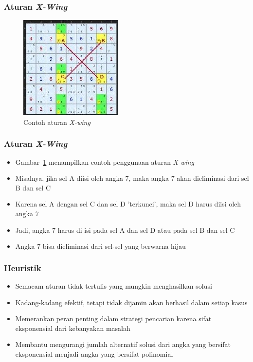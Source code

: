 \documentclass{beamer}
\begin{document}
\begin{frame}
\frametitle{Aturan \textit{X-Wing}}
\begin{figure}
\centering
\captionsetup{justification=centering}
\includegraphics[scale=1]{Gambar/HybridGenetic6}
\caption[Contoh aturan  \textit{X-wing}  ~\cite{johanna:12:hybrid}]{Contoh aturan  \textit{X-wing} ~\cite{johanna:12:hybrid}}
\label{fig:hybrid6}
\end{figure}
\end{frame}

\note{

}

\begin{frame}
\frametitle{Aturan \textit{X-Wing}}
\begin{itemize}
\item Gambar~\ref{fig:hybrid6} menampilkan contoh penggunaan aturan \textit{X-wing}
\item Misalnya, jika sel A diisi oleh angka 7, maka angka 7 akan dieliminasi dari sel B dan sel C
\item Karena sel A dengan sel C dan sel D 'terkunci', maka sel D harus diisi oleh angka 7
\item Jadi, angka 7 harus di isi pada sel A dan sel D atau pada sel B dan sel C
\item Angka 7 bisa dieliminasi dari sel-sel yang berwarna hijau
\end{itemize}
\end{frame}


\begin{frame}
\frametitle{Heuristik}
\begin{itemize}
\item Semacam aturan tidak tertulis yang mungkin menghasilkan solusi
\item Kadang-kadang efektif, tetapi tidak dijamin akan berhasil dalam setiap kasus
\item Memerankan peran penting dalam strategi pencarian karena sifat eksponensial dari kebanyakan masalah
\item Membantu mengurangi jumlah alternatif solusi dari angka yang bersifat eksponensial menjadi angka yang bersifat polinomial
\end{itemize}
\end{frame}
\end{document}
